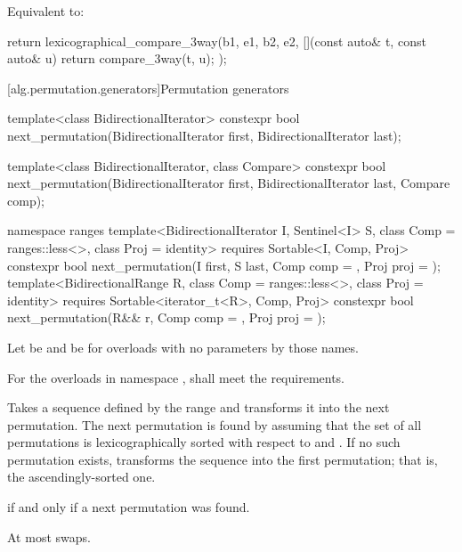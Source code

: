 \begin{itemdescr}
\pnum
\effects
Equivalent to:
\begin{codeblock}
return lexicographical_compare_3way(b1, e1, b2, e2,
                                    [](const auto& t, const auto& u) {
                                      return compare_3way(t, u);
                                    });
\end{codeblock}
\end{itemdescr}

[alg.permutation.generators]{Permutation generators}

%
\begin{itemdecl}
template<class BidirectionalIterator>
  constexpr bool next_permutation(BidirectionalIterator first,
                                  BidirectionalIterator last);

template<class BidirectionalIterator, class Compare>
  constexpr bool next_permutation(BidirectionalIterator first,
                                  BidirectionalIterator last, Compare comp);

namespace ranges {
  template<BidirectionalIterator I, Sentinel<I> S, class Comp = ranges::less<>,
      class Proj = identity>
    requires Sortable<I, Comp, Proj>
    constexpr bool
      next_permutation(I first, S last, Comp comp = {}, Proj proj = {});
  template<BidirectionalRange R, class Comp = ranges::less<>,
      class Proj = identity>
    requires Sortable<iterator_t<R>, Comp, Proj>
    constexpr bool
      next_permutation(R&& r, Comp comp = {}, Proj proj = {});
}
\end{itemdecl}

\begin{itemdescr}
\pnum
Let  be 
and  be 
for overloads with no parameters by those names.

\pnum
\requires
For the overloads in namespace ,
 shall meet the
 requirements.

\pnum
\effects
Takes a sequence defined by the range
and transforms it into the next permutation.
The next permutation is found by assuming that the set of all permutations is
lexicographically sorted with respect to  and .
If no such permutation exists,
transforms the sequence into the first permutation;
that is, the ascendingly-sorted one.

\pnum
\returns
{} if and only if a next permutation was found.

\pnum
\complexity
At most
swaps.
\end{itemdescr}

